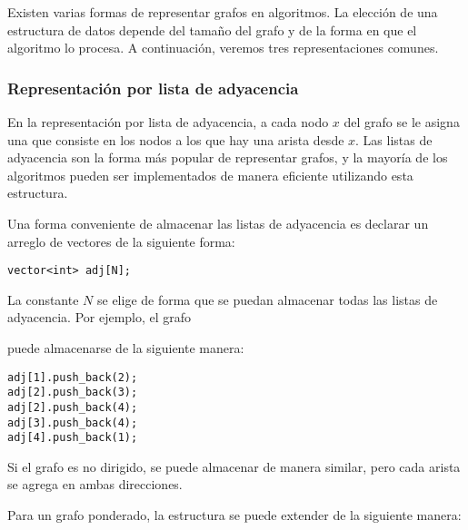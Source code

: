 Existen varias formas de representar grafos
en algoritmos.
La elección de una estructura de datos
depende del tamaño del grafo y
de la forma en que el algoritmo lo procesa.
A continuación, veremos tres representaciones comunes.

\subsubsection{Representación por lista de adyacencia}


En la representación por lista de adyacencia,
a cada nodo $x$ del grafo se le asigna una 
que consiste en los nodos
a los que hay una arista desde $x$.
Las listas de adyacencia son la forma más popular
de representar grafos, y la mayoría de los algoritmos pueden ser
implementados de manera eficiente utilizando esta estructura.

Una forma conveniente de almacenar las listas de adyacencia es declarar
un arreglo de vectores de la siguiente forma:
\begin{lstlisting}
vector<int> adj[N];
\end{lstlisting}

La constante $N$ se elige de forma que se puedan almacenar todas
las listas de adyacencia.
Por ejemplo, el grafo

\begin{center}
\end{center}
puede almacenarse de la siguiente manera:
\begin{lstlisting}
adj[1].push_back(2);
adj[2].push_back(3);
adj[2].push_back(4);
adj[3].push_back(4);
adj[4].push_back(1);
\end{lstlisting}

Si el grafo es no dirigido, se puede almacenar de manera similar,
pero cada arista se agrega en ambas direcciones.

Para un grafo ponderado, la estructura se puede extender
de la siguiente manera:

